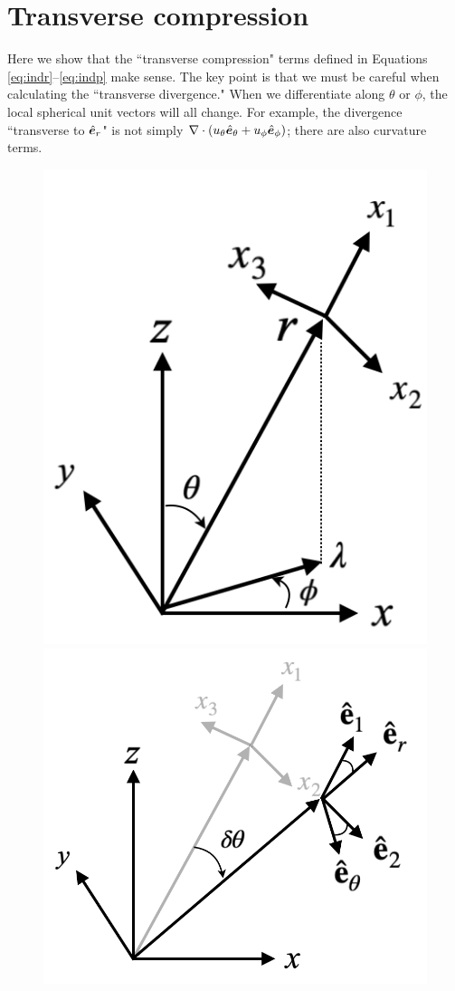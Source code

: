 \documentclass[12pt]{article}
\begin{document}
\section{Transverse compression}\label{sec:compression}
Here we show that the ``transverse compression" terms defined in Equations \eqref{eq:indr}--\eqref{eq:indp} make sense. The key point is that we must be careful when calculating the ``transverse divergence." When we differentiate along $\theta$ or $\phi$, the local spherical unit vectors will all change. For example, the divergence ``transverse to $\hat{\bm{e}}_r$" is not simply $\nabla\cdot(u_\theta\hat{\bm{e}}_\theta + u_\phi\hat{\bm{e}}_\phi)$; there are also curvature terms. 

  \begin{figure}
	\includegraphics[scale=0.4]{Fig1_coordinate_systems.png}\hfill 	\includegraphics[scale=0.35]{Fig2_Pertx2.png}

\end{figure}
\end{document}
